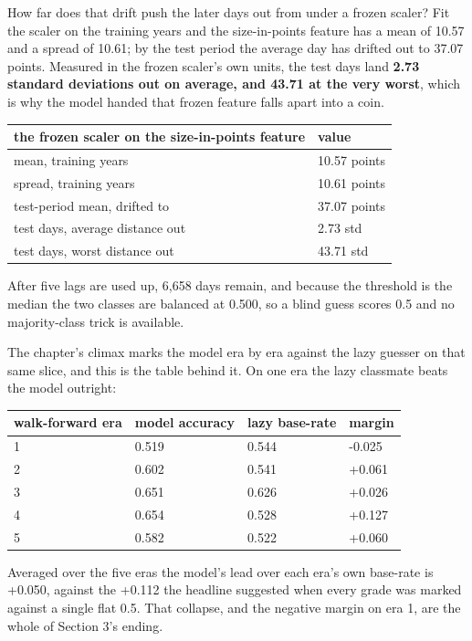 \documentclass[11pt]{article} %
\begin{document}
How far does that drift push the later days out from under a frozen scaler? Fit the scaler on the training years and the size-in-points feature has a mean of 10.57 and a spread of 10.61; by the test period the average day has drifted out to 37.07 points. Measured in the frozen scaler's own units, the test days land \textbf{2.73 standard deviations out on average, and 43.71 at the very worst}, which is why the model handed that frozen feature falls apart into a coin.

\begin{center}
\begin{tabular}{ll}
\hline
the frozen scaler on the size-in-points feature & value \\
\hline
mean, training years & 10.57 points \\
spread, training years & 10.61 points \\
test-period mean, drifted to & 37.07 points \\
test days, average distance out & 2.73 std \\
test days, worst distance out & 43.71 std \\
\hline
\end{tabular}
\end{center}


After five lags are used up, 6,658 days remain, and because the threshold is the median the two classes are balanced at 0.500, so a blind guess scores 0.5 and no majority-class trick is available.

The chapter's climax marks the model era by era against the lazy guesser on that same slice, and this is the table behind it. On one era the lazy classmate beats the model outright:

\begin{center}
\begin{tabular}{llll}
\hline
walk-forward era & model accuracy & lazy base-rate & margin \\
\hline
1 & 0.519 & 0.544 & -0.025 \\
2 & 0.602 & 0.541 & +0.061 \\
3 & 0.651 & 0.626 & +0.026 \\
4 & 0.654 & 0.528 & +0.127 \\
5 & 0.582 & 0.522 & +0.060 \\
\hline
\end{tabular}
\end{center}


Averaged over the five eras the model's lead over each era's own base-rate is +0.050, against the +0.112 the headline suggested when every grade was marked against a single flat 0.5. That collapse, and the negative margin on era 1, are the whole of Section 3's ending.
\end{document}
